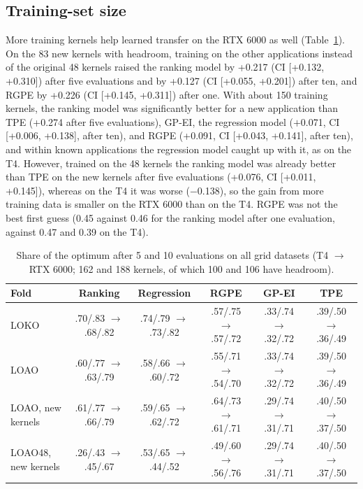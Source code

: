 \documentclass[10pt]{article}
\begin{document}
\subsection{Training-set size}
More training kernels help learned transfer on the RTX 6000 as well
(Table~\ref{tab:repl-more}). On the 83 new kernels with headroom, training on
the other applications instead of the original 48 kernels raised the ranking
model by +0.217 (CI [+0.132, +0.310]) after five evaluations and by +0.127
(CI [+0.055, +0.201]) after ten, and RGPE by +0.226 (CI [+0.145, +0.311]) after
one. With about 150 training kernels, the ranking model was significantly
better for a new application than TPE (+0.274 after five evaluations), GP-EI,
the regression model ($+$0.071, CI [+0.006, +0.138], after ten), and RGPE
(+0.091, CI [+0.043, +0.141], after ten), and within known applications the
regression model caught up with it, as on the T4. However, trained on the 48
kernels the ranking model was already better than TPE on the new kernels
after five evaluations (+0.076, CI [+0.011, +0.145]), whereas on the T4 it was
worse ($-$0.138), so the gain from more training data is smaller on the RTX 6000
than on the T4. RGPE was not the best first guess (0.45 against 0.46 for the
ranking model after one evaluation, against 0.47 and 0.39 on the T4).

\begin{table}[t]
\centering
\caption{Share of the optimum after 5 and 10 evaluations on all grid datasets
(T4 $\to$ RTX 6000; 162 and 188 kernels, of which 100 and 106 have headroom).}
\label{tab:repl-more}
\footnotesize
\setlength{\tabcolsep}{3pt}
\begin{tabular}{lccccc}
\toprule
Fold & Ranking & Regression & RGPE & GP-EI & TPE \\
\midrule
LOKO & .70/.83 $\to$ .68/.82 & .74/.79 $\to$ .73/.82 & .57/.75 $\to$ .57/.72 & .33/.74 $\to$ .32/.72 & .39/.50 $\to$ .36/.49 \\
LOAO & .60/.77 $\to$ .63/.79 & .58/.66 $\to$ .60/.72 & .55/.71 $\to$ .54/.70 & .33/.74 $\to$ .32/.72 & .39/.50 $\to$ .36/.49 \\
LOAO, new kernels & .61/.77 $\to$ .66/.79 & .59/.65 $\to$ .62/.72 & .64/.73 $\to$ .61/.71 & .29/.74 $\to$ .31/.71 & .40/.50 $\to$ .37/.50 \\
LOAO48, new kernels & .26/.43 $\to$ .45/.67 & .53/.65 $\to$ .44/.52 & .49/.60 $\to$ .56/.76 & .29/.74 $\to$ .31/.71 & .40/.50 $\to$ .37/.50 \\
\bottomrule
\end{tabular}
\end{table}
\end{document}

